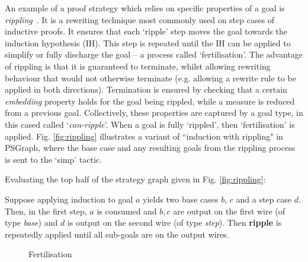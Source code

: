 \documentclass{llncs}
\begin{document}
An example of a proof strategy which relies on specific properties of a goal is \emph{rippling}~\cite{rippling-book}. It is a rewriting technique most commonly used on step cases of inductive proofs. It ensures that each `ripple' step moves the goal towards the induction hypothesis (IH). This step is repeated until the IH can be applied to simplify or fully discharge the goal -- a process called `fertilisation'. The advantage of rippling is that it is guaranteed to terminate, whilst allowing rewriting behaviour that would not otherwise terminate (e.g. allowing a rewrite rule to be applied in both directions). Termination is ensured by checking that a certain \emph{embedding} property holds for the goal being rippled, while a measure is reduced from a previous goal. Collectively, these properties are captured by a goal type, in this cased called `\textit{can-ripple}'. When a goal is fully `rippled', then  `fertilisation' is applied. Fig. \ref{fig:rippling} illustrates a variant of ``induction with rippling" in PSGraph, where the base case and any resulting goals from the rippling process is sent to the `simp' tactic. 


\begin{example}\label{ex:even1}
  Evaluating the top half of the strategy graph given in Fig. \ref{fig:rippling}:
  \begin{center}
  \end{center}
  Suppose applying induction to goal $a$ yields two base cases $b$, $c$ and a step case $d$. Then, in the first step, $a$ is consumed and $b,c$ are output on the first wire (of type \textit{base}) and $d$ is output on the second wire (of type \textit{step}). Then \textbf{ripple} is repeatedly applied until all sub-goals are on the output wires.
\end{example}

\begin{figure}\centering
\vspace{-12pt}
 \vspace{-5pt}
 \caption{Fertilisation}\label{fig:fert}
   \vspace{-14pt}
\end{figure}
\end{document}
